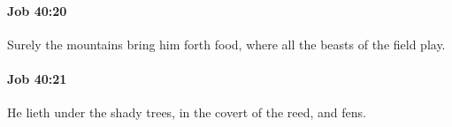 		\paragraph{Job 40:20} %
			\label{JOB-40-20}

			Surely the mountains bring him forth food, where all the beasts of the field play.


		\paragraph{Job 40:21} %
			\label{JOB-40-21}

			He lieth under the shady trees, in the covert of the reed, and fens.


